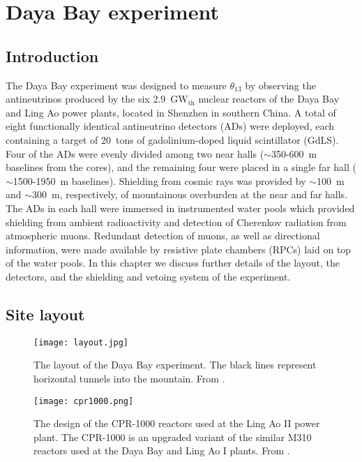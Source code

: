 \documentclass[../thesis.tex]{subfiles}
\begin{document}
\chapter{Daya Bay experiment}
\label{chap:experim}

\section*{Introduction}

The Daya Bay experiment was designed to measure $\theta_{13}$ by observing the antineutrinos produced by the six 2.9~GW$_{\text{th}}$ nuclear reactors of the Daya Bay and Ling Ao power plants, located in Shenzhen in southern China. A total of eight functionally identical antineutrino detectors (ADs) were deployed, each containing a target of 20~tons of gadolinium-doped liquid scintillator (GdLS). Four of the ADs were evenly divided among two near halls ($\sim$350-600~m baselines from the cores), and the remaining four were placed in a single far hall ($\sim$1500-1950~m baselines). Shielding from cosmic rays was provided by $\sim$100~m and $\sim$300~m, respectively, of mountainous overburden at the near and far halls. The ADs in each hall were immersed in instrumented water pools which provided shielding from ambient radioactivity and detection of Cherenkov radiation from atmospheric muons. Redundant detection of muons, as well as directional information, were made available by resistive plate chambers (RPCs) laid on top of the water pools. In this chapter we discuss further details of the layout, the detectors, and the shielding and vetoing system of the experiment.

\section{Site layout}
\label{sec:expLayout}

\begin{figure}[ht]
  \texttt{[image: layout.jpg]}
  \caption{The layout of the Daya Bay experiment. The black lines represent horizontal tunnels into the mountain. From \cite{SideBySide}.}
  \label{fig:layout} 
\end{figure}

\begin{figure}[ht]
  \texttt{[image: cpr1000.png]}
  \caption{The design of the CPR-1000 reactors used at the Ling Ao II power plant. The CPR-1000 is an upgraded variant of the similar M310 reactors used at the Daya Bay and Ling Ao I plants. From \cite{cpr1000}.}
  \label{fig:cpr1000} 
\end{figure}
\end{document}
